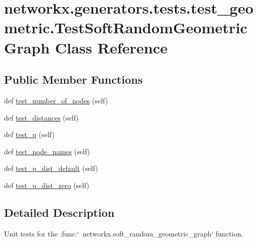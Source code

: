 \hypertarget{classnetworkx_1_1generators_1_1tests_1_1test__geometric_1_1TestSoftRandomGeometricGraph}{}\section{networkx.\+generators.\+tests.\+test\+\_\+geometric.\+Test\+Soft\+Random\+Geometric\+Graph Class Reference}
\label{classnetworkx_1_1generators_1_1tests_1_1test__geometric_1_1TestSoftRandomGeometricGraph}
\subsection*{Public Member Functions}
\begin{DoxyCompactItemize}
\item 
def \hyperlink{classnetworkx_1_1generators_1_1tests_1_1test__geometric_1_1TestSoftRandomGeometricGraph_a0fed4c8d420495b1872d7d442caf3cfa}{test\+\_\+number\+\_\+of\+\_\+nodes} (self)
\item 
def \hyperlink{classnetworkx_1_1generators_1_1tests_1_1test__geometric_1_1TestSoftRandomGeometricGraph_a9ee8bf437f9180261e2b06084971bd26}{test\+\_\+distances} (self)
\item 
def \hyperlink{classnetworkx_1_1generators_1_1tests_1_1test__geometric_1_1TestSoftRandomGeometricGraph_a23fefe06d6ec6461d5078d1ffce969cc}{test\+\_\+p} (self)
\item 
def \hyperlink{classnetworkx_1_1generators_1_1tests_1_1test__geometric_1_1TestSoftRandomGeometricGraph_a620db8f463b4f6fa9fec71aeec5159c6}{test\+\_\+node\+\_\+names} (self)
\item 
def \hyperlink{classnetworkx_1_1generators_1_1tests_1_1test__geometric_1_1TestSoftRandomGeometricGraph_ac2417777f6e3658d8ab33e32e71409b2}{test\+\_\+p\+\_\+dist\+\_\+default} (self)
\item 
def \hyperlink{classnetworkx_1_1generators_1_1tests_1_1test__geometric_1_1TestSoftRandomGeometricGraph_abcd54066e1f48c943d5fd080b58451b5}{test\+\_\+p\+\_\+dist\+\_\+zero} (self)
\end{DoxyCompactItemize}


\subsection{Detailed Description}
\begin{DoxyVerb}Unit tests for the :func:`~networkx.soft_random_geometric_graph`
function.\end{DoxyVerb}
 

